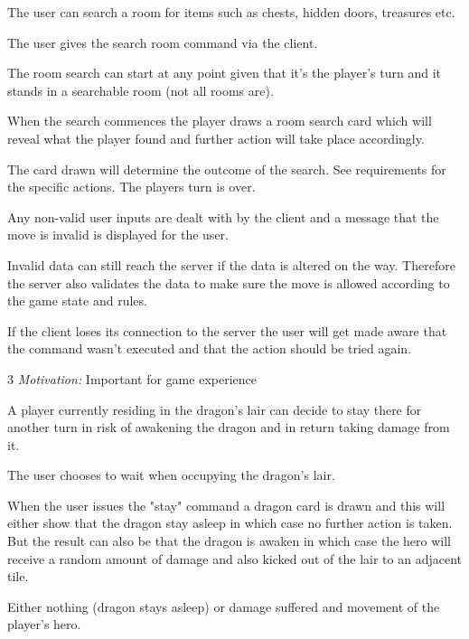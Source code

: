 \stoprequirement


The user can search a room for items such as chests, hidden doors, treasures etc.
 
The user gives the search room command via the client.
 
The room search can start at any point given that it's the player's turn and it stands in a searchable room (not all rooms are).

When the search commences the player draws a room search card which will reveal what the player found and further action will take place accordingly.
 
The card drawn will determine the outcome of the search. See requirements for the specific actions.
The players turn is over.
 
Any non-valid user inputs are dealt with by the client and a message that the move is invalid is displayed for the user.
 
Invalid data can still reach the server if the data is altered on the way. Therefore the server also validates the data to make sure the move is allowed according to the game state and rules.
 
If the client loses its connection to the server the user will get made aware that the command wasn't executed and that the action should be tried again.

3 \emph{Motivation:} Important for game experience

\stoprequirement


 A player currently residing in the dragon's lair can decide to stay there for another turn in risk of awakening the dragon and in return taking damage from it. 

 The user chooses to wait when occupying the dragon's lair.

 When the user issues the "stay" command a dragon card is drawn and this will either show that the dragon stay asleep in which case no further action is taken. But the result can also be that the dragon is awaken in which case the hero will receive a random amount of damage and also kicked out of the lair to an adjacent tile.

 Either nothing (dragon stays asleep) or damage suffered and movement of the player's hero.

